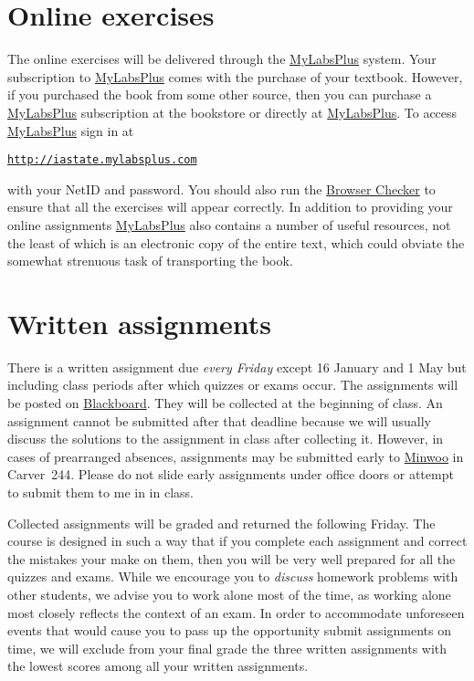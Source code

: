 \documentclass[11pt]{article}
\begin{document}
\section{Online exercises}\label{Online}
The online exercises will be delivered through the
\href{http://iastate.mylabsplus.com}{MyLabsPlus} system.
Your subscription to 
\href{http://iastate.mylabsplus.com}{MyLabsPlus}
comes with the purchase of your textbook.
However, if you purchased the book from some other source,
then you can purchase a 
\href{http://iastate.mylabsplus.com}{MyLabsPlus}
subscription at the bookstore or directly at
\href{http://iastate.mylabsplus.com}{MyLabsPlus}.
To access
\href{http://iastate.mylabsplus.com}{MyLabsPlus}
sign in at
\begin{center}
\href{http://iastate.mylabsplus.com}{\tt http://iastate.mylabsplus.com}
\end{center}
with your NetID and password.
You should also run the
\href{https://www.mathxl.com/BrowserCheck/BrowserCheck.aspx?appproductid=3&courseid=2744761&handler_urn=pearson%2fmlp_mml_xl%2fslink%2fx-pearson-mlp_mml_xl&productid=ccng}{Browser Checker}
to ensure that all the exercises will appear correctly.
In addition to providing your online assignments
\href{http://iastate.mylabsplus.com}{MyLabsPlus}
also contains a number of useful resources, not the least of which is an
electronic copy of the entire text, which could obviate
the somewhat strenuous task of transporting the book.

\section{Written assignments}\label{Written}
There is a written assignment due {\em every 
Friday} except 16 January and 1 May
but including class periods
after which quizzes or exams occur.
The assignments will be posted on \href{https://bb.its.iastate.edu}{Blackboard}.
They will be collected at the beginning
of class. An assignment cannot be submitted after that deadline
because we will usually discuss the solutions to the assignment
in class after collecting it.
However, in cases of prearranged absences, assignments may be submitted
early to \href{mailto:mws@iastate.edu}{Minwoo} in Carver~244.
Please do not slide early assignments under office doors or attempt
to submit them to me in in class.

Collected assignments will be graded and returned the following Friday.
The course is designed in such a way that if you complete each assignment and 
correct the mistakes your make on them,
then you will be very well prepared for all the quizzes and exams.
While we encourage you to {\em discuss} homework problems with other
students, we advise you to work alone most of the time,
as working alone most closely reflects the context of an exam.
In order to accommodate unforeseen events that would cause you
to pass up the opportunity submit assignments on time,
we will exclude from your final grade
the three written assignments with the lowest scores among
all your written assignments.
\end{document}
